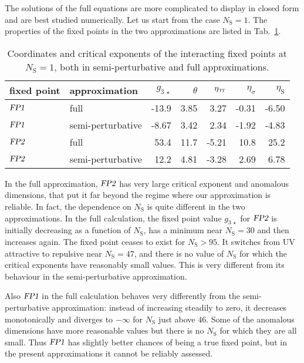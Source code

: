 \documentclass[11pt]{book} %
\newcommand\TTspace{ -1pt }
\newcommand\etaTT{ \eta_{\scriptscriptstyle{\mathrm{T\hspace{\TTspace}T}}} }
\newcommand\etaS{ \eta_{\scriptscriptstyle{\mathrm{S}}} }
\newcommand\NS{ N_{\scriptscriptstyle{\mathrm{S}}} }
\newcommand{\FPone}  {\textsl{FP1}}
\newcommand{\FPtwo}  {\textsl{FP2}}
\numberwithin{equation}{chapter}
\begin{document}
The solutions of the full equations are more complicated to display
in closed form and are best studied numerically.
Let us start from the case $\NS=1$.
The properties of the fixed points in the two approximations
are listed in Tab.~\ref{FPtab3}.
\begin{table}[]
  \begin{center}
    \begin{tabular}{ l l r r r r r }
      \toprule
      fixed point & approximation     & $g_{3\,\star}$ & $\theta$ & $\etaTT$        & $\eta_{\sigma}$ & $\etaS$ \\
      \midrule
      $\FPone$    & full              & -13.9          & 3.85     & 3.27            & -0.31           & -6.50   \\
      $\FPone$    & semi-perturbative & -8.67          & 3.42     & 2.34            & -1.92           & -4.83   \\
      $\FPtwo$    & full              & 53.4           & 11.7     & -5.21           & 10.8            & 25.2    \\
      $\FPtwo$    & semi-perturbative & 12.2           & 4.81     & -3.28           & 2.69            & 6.78    \\
      \bottomrule
    \end{tabular}
  \end{center}
  \caption[Coordinates and critical exponents of fixed points for one scalar]
  {
    Coordinates and critical exponents of the interacting fixed points at $\NS=1$,
    both in semi-perturbative and full approximations.
  }
  \label{FPtab3}
\end{table}
In the full approximation, $\FPtwo$ has very large critical exponent and anomalous dimensions,
that put it far beyond the regime where our approximation is reliable.
In fact, the dependence on $\NS$ is quite different in the two approximations.
In the full calculation, the fixed point value $g_{3\,\star}$ for $\FPtwo$
is initially decreasing as a function of $\NS$,
has a minimum near $\NS=30$ and then increases again.
The fixed point ceases to exist for $\NS>95$.
It switches from UV attractive to repulsive near $\NS=47$,
and there is no value of $\NS$ for which the critical exponents
have reasonably small values.
This is very different from its behaviour in the semi-perturbative
approximation.

Also $\FPone$ in the full calculation behaves very differently from
the semi-perturbative approximation:
instead of increasing steadily to zero, it decreases monotonically
and diverges to $-\infty$ for $\NS$ just above $46$.
Some of the anomalous dimensions have more reasonable values
but there is no $\NS$ for which they are all small.
Thus $\FPone$ has slightly better chances of being
a true fixed point, but in the present approximations
it cannot be reliably assessed.
\end{document}
